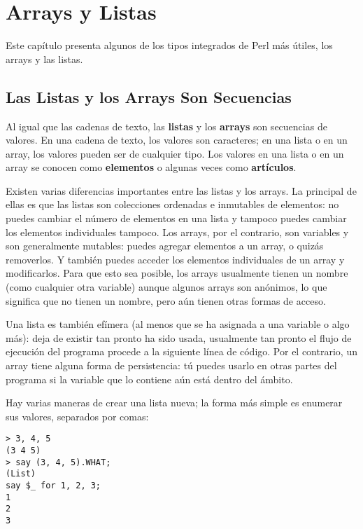 

\chapter{Arrays y Listas}
\label{arrays}

Este capítulo presenta algunos de los tipos integrados
de Perl más útiles, los arrays y las listas.


\section{Las Listas y los Arrays Son Secuencias}
\label{sequence}

Al igual que las cadenas de texto, las {\bf listas} y los {\bf arrays}
son secuencias de valores. En una cadena de texto, los valores son
caracteres; en una lista o en un array, los valores pueden ser
de cualquier tipo. Los valores en una lista o en un array se 
conocen  como {\bf elementos} o algunas veces como {\bf artículos}.

Existen varias diferencias importantes entre las listas y los arrays.
La principal de ellas es que las listas son colecciones ordenadas e inmutables
de elementos: no puedes cambiar el número de elementos en una lista y tampoco puedes
cambiar los elementos individuales tampoco. Los arrays, por el contrario,
son variables y son generalmente mutables: puedes agregar elementos 
a un array, o quizás removerlos. Y también puedes acceder los
elementos individuales de un array y modificarlos. Para que esto sea
posible, los arrays usualmente tienen un nombre (como cualquier otra variable)
aunque algunos arrays son anónimos, lo que significa que no tienen 
un nombre, pero aún tienen otras formas de acceso.

Una lista es también efímera (al menos que se ha asignada a una
variable o algo más): deja de existir tan pronto ha sido usada,
usualmente tan pronto el flujo de ejecución del programa procede
a la siguiente línea de código. Por el contrario, un array tiene
alguna forma de persistencia: tú puedes usarlo en otras partes del
programa si la variable que lo contiene aún está dentro del
ámbito.

Hay varias maneras de crear una lista nueva;
la forma más simple es enumerar sus valores, separados
por comas:

\begin{verbatim}
> 3, 4, 5
(3 4 5)
> say (3, 4, 5).WHAT;
(List)
say $_ for 1, 2, 3;
1
2
3
\end{verbatim}
%

